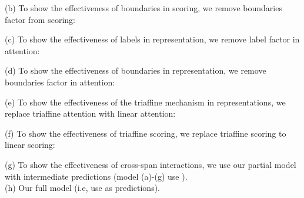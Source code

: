 \documentclass[11pt]{article}
\begin{document}
    \noindent(b) To show the effectiveness of boundaries in scoring, we remove boundaries factor from scoring:
    
    \noindent(c) To show the effectiveness of labels in representation, we remove label factor in attention:

    \noindent(d) To show the effectiveness of boundaries in representation, we remove boundaries factor in attention:

    \noindent(e) To show the effectiveness of the triaffine mechanism in representations, we replace
triaffine attention with linear attention:

    \noindent(f) To show the effectiveness of triaffine scoring, we replace
    triaffine scoring to linear scoring:
    
    \noindent(g) To show the effectiveness of cross-span interactions, we use 
    our partial model with intermediate predictions (model (a)-(g) use ). \\
    \noindent(h) Our full model (i.e, use  as predictions).
    
\end{document}
